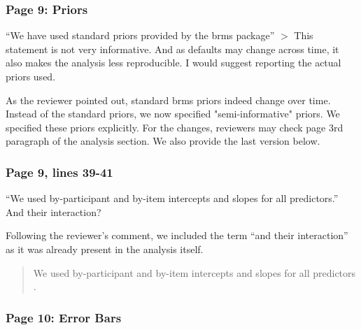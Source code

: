\documentclass{ar2rc}
\begin{document}
\subsubsection{Page 9: Priors}

\RC ``We have used standard priors provided by the brms package'' $>$ This statement is not very informative. And as defaults may change across time, it also makes the analysis less reproducible. I would suggest reporting the actual priors used.

\AC As the reviewer pointed out, standard brms priors indeed change over time. Instead of the standard priors, we now specified "semi-informative" priors. We specified these priors explicitly. For the changes, reviewers may check page 3rd paragraph of the analysis section. We also provide the last version below.

\begin{quote}
    \DIFdelbegin {} \DIFdelend{} \DIFaddbegin {} \DIFaddend
\end{quote}


\subsubsection{Page 9, lines 39-41}

\RC ``We used by-participant and by-item intercepts and slopes for all predictors.'' And their interaction?

\AC Following the reviewer's comment, we included the term ``and their interaction'' as it was already present in the analysis itself.


\begin{quote}
    We used by-participant and by-item intercepts and slopes for all predictors \DIFaddbegin {} \DIFaddend.
\end{quote}


\subsubsection{Page 10: Error Bars}
\end{document}
